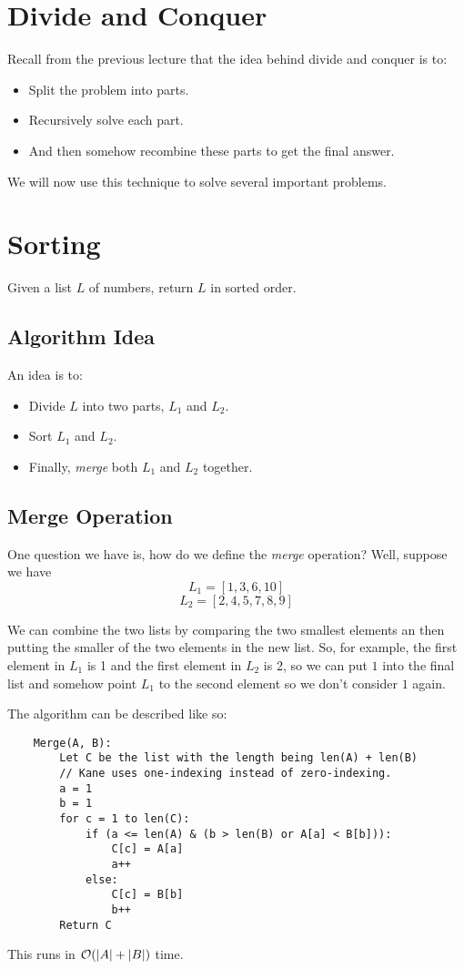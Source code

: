 \documentclass[letterpaper]{article}
\begin{document}
\section{Divide and Conquer}
Recall from the previous lecture that the idea behind divide and conquer is to:
\begin{itemize}
    \item Split the problem into parts. 
    \item Recursively solve each part. 
    \item And then somehow recombine these parts to get the final answer. 
\end{itemize}
We will now use this technique to solve several important problems. 

\section{Sorting}
Given a list $L$ of numbers, return $L$ in sorted order.

\subsection{Algorithm Idea}
An idea is to: 
\begin{itemize}
    \item Divide $L$ into two parts, $L_1$ and $L_2$. 
    \item Sort $L_1$ and $L_2$. 
    \item Finally, \emph{merge} both $L_1$ and $L_2$ together. 
\end{itemize}

\subsection{Merge Operation}
One question we have is, how do we define the \emph{merge} operation? Well, suppose we have
\[L_1 = [1, 3, 6, 10]\]
\[L_2 = [2, 4, 5, 7, 8, 9]\]

We can combine the two lists by comparing the two smallest elements an then putting the smaller of the two elements in the new list. So, for example, the first element in $L_1$ is 1 and the first element in $L_2$ is 2, so we can put $1$ into the final list and somehow point $L_1$ to the second element so we don't consider $1$ again. 

\bigskip 

The algorithm can be described like so: 
\begin{verbatim}
    Merge(A, B):
        Let C be the list with the length being len(A) + len(B)
        // Kane uses one-indexing instead of zero-indexing.
        a = 1 
        b = 1
        for c = 1 to len(C):
            if (a <= len(A) & (b > len(B) or A[a] < B[b])):
                C[c] = A[a]
                a++ 
            else:
                C[c] = B[b]
                b++ 
        Return C
\end{verbatim}
This runs in $\mathcal{O}(|A| + |B|)$ time. 
\end{document}
